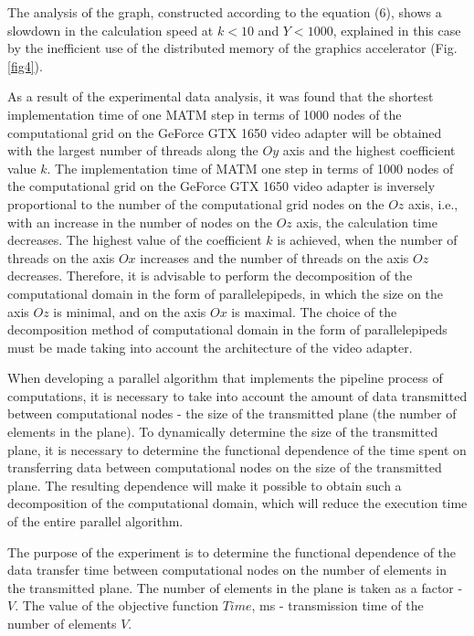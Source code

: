 \documentclass{svproc}
\begin{document}
The analysis of the graph, constructed according to the equation (6), shows a slowdown in the calculation speed at $k<10$ and $Y<1000$, explained in this case by the inefficient use of the distributed memory of the graphics accelerator (Fig. \ref{fig4}).

As a result of the experimental data analysis, it was found that the shortest implementation time of one MATM step in terms of 1000 nodes of the computational grid on the GeForce GTX 1650 video adapter will be obtained with the largest number of threads along the $Oy$ axis and the highest coefficient value $k$.
The implementation time of MATM one step in terms of 1000 nodes of the computational grid on the GeForce GTX 1650 video adapter is inversely proportional to the number of the computational grid nodes on the $Oz$ axis, i.e., with an increase in the number of nodes on the $Oz$ axis, the calculation time decreases.
The highest value of the coefficient $k$ is achieved, when the number of threads on the axis $Ox$ increases and the number of threads on the axis $Oz$ decreases.
Therefore, it is advisable to perform the decomposition of the computational domain in the form of parallelepipeds, in which the size on the axis $Oz$ is minimal, and on the axis $Ox$ is maximal.
The choice of the decomposition method of computational domain in the form of parallelepipeds must be made taking into account the architecture of the video adapter.


When developing a parallel algorithm that implements the pipeline process of computations, it is necessary to take into account the amount of data transmitted between computational nodes - the size of the transmitted plane (the number of elements in the plane).
To dynamically determine the size of the transmitted plane, it is necessary to determine the functional dependence of the time spent on transferring data between computational nodes on the size of the transmitted plane.
The resulting dependence will make it possible to obtain such a decomposition of the computational domain, which will reduce the execution time of the entire parallel algorithm.

The purpose of the experiment is to determine the functional dependence of the data transfer time between computational nodes on the number of elements in the transmitted plane.
The number of elements in the plane is taken as a factor - $V$.
The value of the objective function $Time$, ms - transmission time of the number of elements $V$. 
\end{document}
